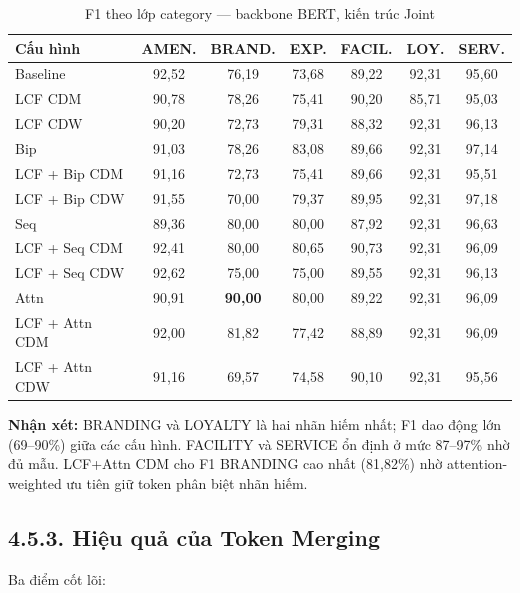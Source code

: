 \begin{table}[H]
\centering
\small
\caption{F1 theo lớp category — backbone BERT, kiến trúc Joint}
\label{tab:category_perclass}
\begin{tabular}{@{}lcccccc@{}}
\toprule
\textbf{Cấu hình} & \textbf{AMEN.} & \textbf{BRAND.} & \textbf{EXP.}
                  & \textbf{FACIL.} & \textbf{LOY.} & \textbf{SERV.} \\
\midrule
Baseline          & 92,52 & 76,19 & 73,68 & 89,22 & 92,31 & 95,60 \\
LCF CDM           & 90,78 & 78,26 & 75,41 & 90,20 & 85,71 & 95,03 \\
LCF CDW           & 90,20 & 72,73 & 79,31 & 88,32 & 92,31 & 96,13 \\
Bip               & 91,03 & 78,26 & 83,08 & 89,66 & 92,31 & 97,14 \\
LCF + Bip CDM     & 91,16 & 72,73 & 75,41 & 89,66 & 92,31 & 95,51 \\
LCF + Bip CDW     & 91,55 & 70,00 & 79,37 & 89,95 & 92,31 & 97,18 \\
Seq               & 89,36 & 80,00 & 80,00 & 87,92 & 92,31 & 96,63 \\
LCF + Seq CDM     & 92,41 & 80,00 & 80,65 & 90,73 & 92,31 & 96,09 \\
LCF + Seq CDW     & 92,62 & 75,00 & 75,00 & 89,55 & 92,31 & 96,13 \\
Attn              & 90,91 & \textbf{90,00} & 80,00 & 89,22 & 92,31 & 96,09 \\
LCF + Attn CDM    & 92,00 & 81,82 & 77,42 & 88,89 & 92,31 & 96,09 \\
LCF + Attn CDW    & 91,16 & 69,57 & 74,58 & 90,10 & 92,31 & 95,56 \\
\bottomrule
\end{tabular}
\end{table}

\textbf{Nhận xét:} BRANDING và LOYALTY là hai nhãn hiếm nhất; F1
dao động lớn (69--90\%) giữa các cấu hình. FACILITY và SERVICE ổn
định ở mức 87--97\% nhờ đủ mẫu. LCF+Attn CDM cho F1 BRANDING cao
nhất (81,82\%) nhờ attention-weighted ưu tiên giữ token phân biệt
nhãn hiếm.

\subsection{4.5.3.\; Hiệu quả của Token Merging}

Ba điểm cốt lõi:

